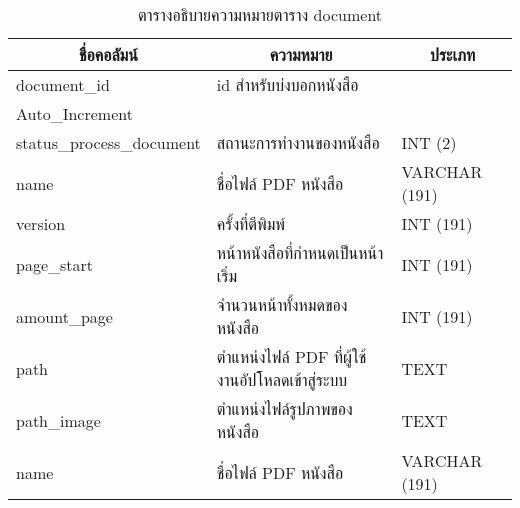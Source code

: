 \begin{longtable}[l]{|l|l|l|}
\caption{ตารางอธิบายความหมายตาราง document}
\label{tbl:document}
\endfirsthead
\endhead

\hline
\multicolumn{1}{|c|}{ชื่อคอลัมน์}      & \multicolumn{1}{c|}{ความหมาย}                    & \multicolumn{1}{c|}{ประเภท}                                                       \\ \hline 
document\_id                         & id สำหรับบ่งบอกหนังสือ                                        & \begin{tabular}[c]{@{}l@{}}INT(10)   \\ Auto\_Increment\end{tabular} \\ \hline
status\_process\_document            & สถานะการทำงานของหนังสือ                                       & INT   (2)                                                            \\ \hline
name                                 & ชื่อไฟล์ PDF หนังสือ                                          & VARCHAR   (191)                                                      \\ \hline
version                              & ครั้งที่ตีพิมพ์                                              & INT   (191)                                                          \\ \hline
page\_start                          & หน้าหนังสือที่กำหนดเป็นหน้าเริ่ม                              & INT   (191)                                                          \\ \hline
amount\_page                         & จำนวนหน้าทั้งหมดของหนังสือ                                    & INT   (191)                                                          \\ \hline
path                                 & ตำแหน่งไฟล์ PDF ที่ผู้ใช้งานอัปโหลดเข้าสู่ระบบ               & TEXT                                                                 \\ \hline
path\_image                          & ตำแหน่งไฟล์รูปภาพของหนังสือ                                   & TEXT                                                                 \\ \hline
name                                 & ชื่อไฟล์ PDF หนังสือ                                          & VARCHAR (191)                                                        \\ \hline

\end{longtable}
